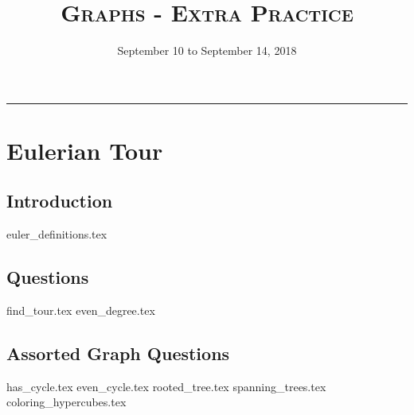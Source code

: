 \documentclass{exam}
\title{\textsc{Graphs - Extra Practice}}
\date{September 10 to September 14, 2018}
\begin{document}
\maketitle
\rule{\textwidth}{0.15em}
\fontsize{12}{15}\selectfont
\thispagestyle{empty}

\section{Eulerian Tour}
\subsection{Introduction}
{euler_definitions.tex}
\subsection{Questions}
\begin{questions}
{find_tour.tex}
{even_degree.tex}
\end{questions}

\subsection{Assorted Graph Questions}
\begin{questions}
{has_cycle.tex}
{even_cycle.tex}
{rooted_tree.tex}
{spanning_trees.tex}
{coloring_hypercubes.tex}
\end{questions}
\end{document}
